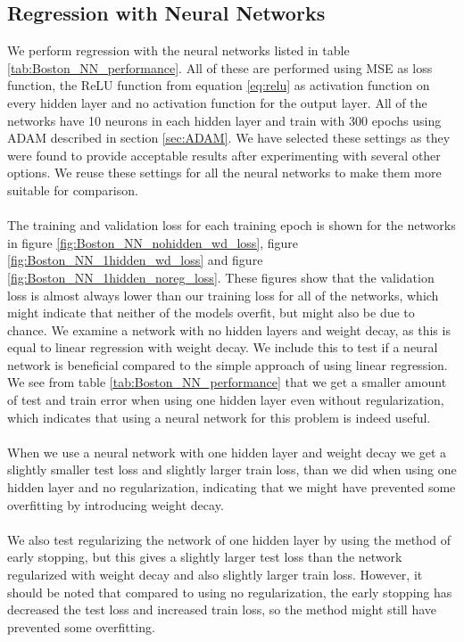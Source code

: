 \subsection{Regression with Neural Networks}\label{sec:regre_w_NN}
We perform regression with the neural networks listed in table \ref{tab:Boston_NN_performance}. All of these are performed using MSE as loss function, the ReLU function from equation \ref{eq:relu} as activation function on every hidden layer and no activation function for the output layer. All of the networks have 10 neurons in each hidden layer and train with 300 epochs using ADAM described in section \ref{sec:ADAM}. We have selected these settings as they were found to provide acceptable results after experimenting with several other options. We reuse these settings for all the neural networks to make them more suitable for comparison. 
\\
\\
The training and validation loss for each training epoch is shown for the networks in figure \ref{fig:Boston_NN_nohidden_wd_loss}, figure \ref{fig:Boston_NN_1hidden_wd_loss} and figure \ref{fig:Boston_NN_1hidden_noreg_loss}. These figures show that the validation loss is almost always lower than our training loss for all of the networks, which might indicate that neither of the models overfit, but might also be due to chance. 
\noindent
We examine a network with no hidden layers and weight decay, as this is equal to linear regression with weight decay. We include this to test if a neural network is beneficial compared to the simple approach of using linear regression. We see from table \ref{tab:Boston_NN_performance} that we get a smaller amount of test and train error when using one hidden layer even without regularization, which indicates that using a neural network for this problem is indeed useful.
\\
\\
When we use a neural network with one hidden layer and weight decay we get a slightly smaller test loss and slightly larger train loss, than we did when using one hidden layer and no regularization, indicating that we might have prevented some overfitting by introducing weight decay. 
\\
\\
We also test regularizing the network of one hidden layer by using the method of early stopping, but this gives a slightly larger test loss than the network regularized with weight decay and also slightly larger train loss. However, it should be noted that compared to using no regularization, the early stopping has decreased the test loss and increased train loss, so the method might still have prevented some overfitting.
